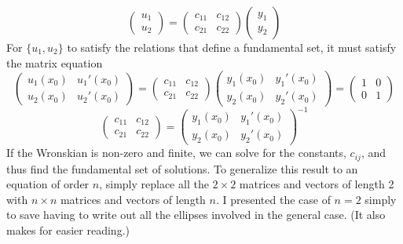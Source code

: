 \[
\begin{pmatrix}
  u_1 \\ u_2 
\end{pmatrix}
=
\begin{pmatrix}
  c_{11}  &c_{12} \\
  c_{21}  &c_{22} 
\end{pmatrix}
\begin{pmatrix}
  y_1 \\  y_2 
\end{pmatrix}
\]
For $\{u_1, u_2\}$ to satisfy the relations that define a
fundamental set, it must satisfy the matrix equation
\[
\begin{pmatrix}
  u_1(x_0)        &u_1'(x_0) \\
  u_2(x_0)       &u_2'(x_0)
\end{pmatrix}
=
\begin{pmatrix}
  c_{11}  &c_{12} \\
  c_{21}  &c_{22} 
\end{pmatrix}
\begin{pmatrix}
  y_1(x_0)                &y_1'(x_0) \\
  y_2(x_0)               &y_2'(x_0) 
\end{pmatrix}
=
\begin{pmatrix}
  1       &0 \\
  0       &1
\end{pmatrix}
\]
\[
\begin{pmatrix}
  c_{11}  &c_{12} \\
  c_{21}  &c_{22} 
\end{pmatrix}
=
\begin{pmatrix}
  y_1(x_0)                &y_1'(x_0) \\
  y_2(x_0)               &y_2'(x_0) 
\end{pmatrix}^{-1}
\]
If the Wronskian is non-zero and finite, we can solve for the constants,
$c_{i j}$, and thus find the fundamental set of solutions.
To generalize this result to an equation of order $n$, simply 
replace all the $2 \times 2$ matrices and vectors of length 2 with  
$n \times n$
matrices and vectors of length $n$.  I presented the case of $n=2$ simply
to save having to write out all the ellipses involved in the general case.
(It also makes for easier reading.)





